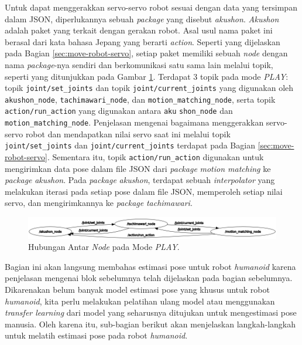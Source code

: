 Untuk dapat menggerakkan servo-servo robot sesuai dengan data yang tersimpan dalam JSON, diperlukannya sebuah \textit{package} yang disebut \emph{akushon}. \emph{Akushon} adalah paket yang terkait dengan gerakan robot. Asal usul nama paket ini berasal dari kata bahasa Jepang yang berarti \textit{action}.
Seperti yang dijelaskan pada Bagian \ref{sec:move-robot-servo}, setiap paket memiliki sebuah \textit{node} dengan nama \textit{package}-nya sendiri dan berkomunikasi satu sama lain melalui topik, seperti yang ditunjukkan pada Gambar \ref{fig:relation-node-play-mode}. Terdapat 3 topik pada mode \textit{PLAY}: topik \verb|joint/set_joints| dan topik \verb|joint/current_joints| yang digunakan oleh \verb|akushon_node|, \verb|tachimawari_node|, dan \verb|motion_matching_node|,
serta topik \verb|action/run_action| yang digunakan antara \verb|aku| \verb|shon_node| dan \verb|motion_matching_node|.
Penjelasan mengenai bagaimana menggerakkan servo-servo robot dan mendapatkan nilai servo saat ini melalui topik \verb|joint/set_joints| dan \verb|joint/current_joints| terdapat pada Bagian \ref{sec:move-robot-servo}.
Sementara itu, topik \verb|action/run_action| digunakan untuk mengirimkan data pose dalam file JSON dari \textit{package} \emph{motion matching} ke \textit{package} \emph{akushon}. Pada \textit{package} \emph{akushon}, terdapat sebuah \textit{interpolator} yang melakukan iterasi pada setiap pose dalam file JSON, memperoleh setiap nilai servo, dan mengirimkannya ke \textit{package} \emph{tachimawari}.
\begin{figure}[ht]
  \centering
  \includegraphics[scale=0.64]{gambar/rqt_akushon.png}
  \caption{Hubungan Antar \textit{Node} pada Mode \textit{PLAY}.}
  \label{fig:relation-node-play-mode}
\end{figure}

Bagian ini akan langsung membahas estimasi pose untuk robot \textit{humanoid} karena penjelasan mengenai blok sebelumnya telah dijelaskan pada bagian sebelumnya.
Dikarenakan belum banyak model estimasi pose yang khusus untuk robot \textit{humanoid}, kita perlu melakukan pelatihan ulang model atau menggunakan \textit{transfer learning} dari model yang seharusnya ditujukan untuk mengestimasi pose manusia.
Oleh karena itu, sub-bagian berikut akan menjelaskan langkah-langkah untuk melatih estimasi pose pada robot \textit{humanoid}.

